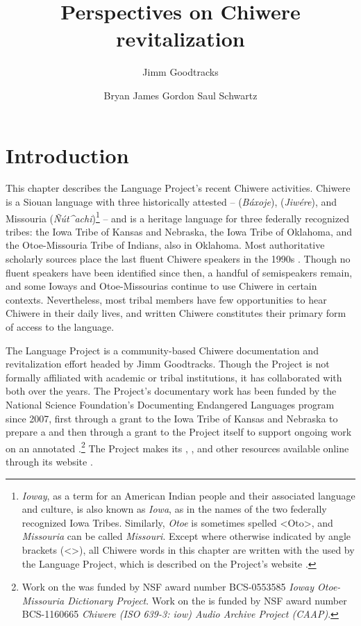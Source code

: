 \documentclass[output=paper]{LSP/langsci}
\author{Jimm Goodtracks\and Bryan James Gordon \lastand Saul Schwartz}
\title{Perspectives on {Chiwere} revitalization}
\begin{document}
\section{Introduction} 
This chapter describes the  Language Project's recent Chiwere  activities. Chiwere is a Siouan language with three historically attested  --  (\emph{Báxoje}),  (\emph{Jiwére}), and Missouria (\emph{Ñút\^{ }\-achi})\footnote{\emph{Ioway}, as a term for an American Indian people and their associated language and culture, is also known as \emph{Iowa}, as in the names of the two federally recognized Iowa Tribes. Similarly, \emph{Otoe} is sometimes spelled <Oto>, and \emph{Missouria} can be called \emph{Missouri}. Except where otherwise indicated by angle brackets (<>), all Chiwere words in this chapter are written with the  used by the  Language Project, which is described on the Project's website \citep{GoodtracksND}.} -- and is a heritage language for three federally recognized tribes: the Iowa Tribe of Kansas and Nebraska, the Iowa Tribe of Oklahoma, and the Otoe-Missouria Tribe of Indians, also in Oklahoma. Most authoritative scholarly sources place the last fluent Chiwere speakers in the 1990s \citep{Lewisetal2013, ParksRankin2001}. Though no fluent speakers have been identified since then, a handful of semispeakers remain, and some Ioways and Otoe-Missourias continue to use Chiwere in certain contexts. Nevertheless, most tribal members have few opportunities to hear Chiwere in their daily lives, and written Chiwere constitutes their primary form of access to the language.
 

The  Language Project is a community-based Chiwere documentation and revitalization effort headed by Jimm Goodtracks. Though the Project is not formally affiliated with academic or tribal institutions, it has collaborated with both over the years. The Project's documentary work has been funded by the National Science Foundation's Documenting Endangered Languages program since 2007, first through a grant to the Iowa Tribe of Kansas and Nebraska to prepare a  and then through a grant to the Project itself to support ongoing work on an annotated .\footnote{Work on the  was funded by NSF award number BCS-0553585 \emph{Ioway Otoe-Missouria Dictionary Project}. Work on the  is funded by NSF award number BCS-1160665 \emph{Chiwere (ISO 639-3: iow) Audio Archive Project (CAAP)}.}  The Project makes its , , and other resources available online through its website \citep{GoodtracksND}. 
\end{document}
